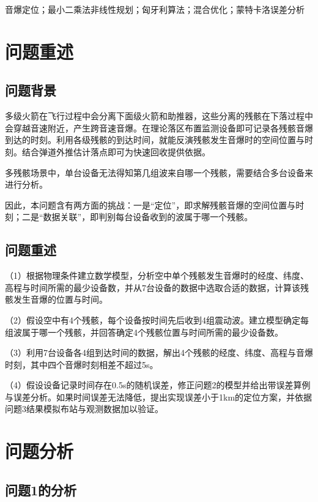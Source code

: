 \documentclass[12pt,a4paper]{article}
\begin{document}
\vspace{2ex}
 音爆定位；最小二乘法非线性规划；匈牙利算法；混合优化；蒙特卡洛误差分析

\clearpage
\section{问题重述}
\subsection{问题背景}
多级火箭在飞行过程中会分离下面级火箭和助推器，这些分离的残骸在下落过程中会穿越音速附近，产生跨音速音爆。在理论落区布置监测设备即可记录各残骸音爆到达的时刻。利用各级残骸的到达时间，就能反演残骸发生音爆时的空间位置与时刻。结合弹道外推估计落点即可为快速回收提供依据。

多残骸场景中，单台设备无法得知第几组波来自哪一个残骸，需要结合多台设备来进行分析。

因此，本问题含有两方面的挑战：一是“定位”，即求解残骸音爆的空间位置与时刻；二是“数据关联”，即判别每台设备收到的波属于哪一个残骸。

\subsection{问题重述}

（1）根据物理条件建立数学模型，分析空中单个残骸发生音爆时的经度、纬度、高程与时间所需的最少设备数，并从7台设备的数据中选取合适的数据，计算该残骸发生音爆的位置与时间。

（2）假设空中有4个残骸，每个设备按时间先后收到4组震动波。建立模型确定每组波属于哪一个残骸，并回答确定4个残骸位置与时间所需的最少设备数。

（3）利用7台设备各4组到达时间的数据，解出4个残骸的经度、纬度、高程与音爆时刻，其中四个音爆时刻相差不超过5s。

（4）假设设备记录时间存在0.5s的随机误差，修正问题2的模型并给出带误差算例与误差分析。如果时间误差无法降低，提出实现误差小于1km的定位方案，并依据问题3结果模拟布站与观测数据加以验证。


\section{问题分析}

\subsection{问题1的分析}
\end{document}
